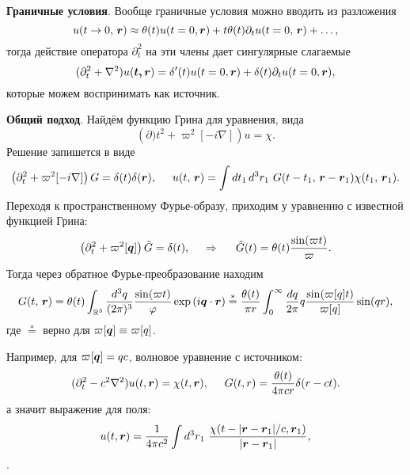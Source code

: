 
\textbf{Граничные условия}. 
Вообще граничные условия можно вводить из разложения
\begin{equation*}
    u(t\to 0,\, \mbox{\boldmath $r$}) \approx \theta(t) u(t=0, \mbox{\boldmath $r$}) + t \theta(t) \partial_t u(t=0,\, \mbox{\boldmath $r$}) + \ldots,
\end{equation*}
тогда действие оператора $\partial_t^2$ на эти члены дает сингулярные слагаемые
\begin{equation*}
    (\partial_t^2 + \nabla^2)u(\mbox{\boldmath $t,r$}) = \delta'(t) u(t=0, \mbox{\boldmath $r$}) + \delta(t) \partial_t u(t=0, \mbox{\boldmath $r$}),
\end{equation*}
которые можем воспринимать как источник.




\textbf{Общий подход}. Найдём функцию Грина для уравнения, вида
\begin{equation*}
    \left(\partial)t^2 + \varpi^2[-i \nabla]\right) u = \chi.
\end{equation*}
Решение запишется в виде
\begin{equation*}
    \left(
        \partial_t^2 + \varpi^2[-i \nabla]
    \right) G = \delta(t) \delta(\vc{r}),
    \hspace{5 mm} 
    u(t,\, \vc{r}) = \int dt_1\, d^3 r_1\ 
    G(t-t_1,\, \vc{r}- \vc{r}_1) \chi(t_1,\, \vc{r}_1).
\end{equation*}
Переходя к пространственному Фурье-образу, приходим у уравнению с известной функцией Грина:
\begin{equation*}
    \left(\partial_t^2 + \varpi^2[\mbox{\boldmath $q$}]\right) \tilde{G} = \delta(t),
    \hspace{0.5cm} \Rightarrow \hspace{0.5cm}   
    \tilde{G}(t) = \theta(t) \frac{\sin(\varpi t)}{\varpi}.
\end{equation*}
Тогда через обратное Фурье-преобразование находим
\begin{equation*}
    G(t,\, \mbox{\boldmath $r$}) = \theta(t) \int_{\mathbb{R}^3} \frac{d^3 q}{(2\pi)^3} \frac{\sin(\varpi t)}{\varphi} \exp\left(i \mbox{\boldmath $q$} \cdot \mbox{\boldmath $r$}\right) \overset{*}{=} 
    \frac{\theta(t)}{\pi r} \int_{0}^{\infty}  \frac{dq}{2\pi} q \frac{\sin(\varpi[q] t)}{\varpi[q]} \sin(qr)
    ,
\end{equation*}
где $\overset{*}{=}$ верно для $\varpi[\mbox{\boldmath $q$}] \equiv \varpi[q]$. 



Например, для $\varpi[\mbox{\boldmath $q$}] = qc$, волновое уравнение с источником:
\begin{equation}
    (\partial_t^2 - c^2 \nabla^2) u(t, \mbox{\boldmath $r$}) = \chi(t, \mbox{\boldmath $r$}),
    \hspace{5 mm} 
    G(t, r) = \frac{\theta(t)}{4 \pi c r} \delta(r - ct).
\end{equation}
а значит выражение для поля:
\begin{equation}
    u(t, \mbox{\boldmath $r$}) = \frac{1}{4 \pi c^2} \int d^3 r_1 \ \frac{\chi(t-|\mbox{\boldmath $r$} - \mbox{\boldmath $r$}_1|/c, \mbox{\boldmath $r$}_1)}{|\mbox{\boldmath $r$} - \mbox{\boldmath $r$}_1|},
\end{equation}
.


